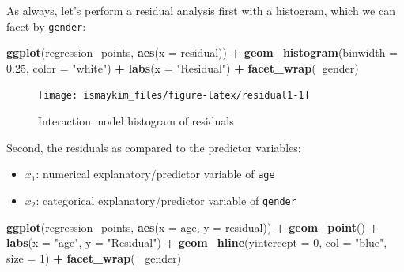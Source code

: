 \documentclass[12pt,]{krantz}
\makeatletter
\newenvironment{Shaded}{\begin{snugshade}}{\end{snugshade}}
\newcommand{\KeywordTok}[1]{\textcolor[rgb]{0.27,0.27,0.27}{\textbf{#1}}}
\newcommand{\DataTypeTok}[1]{\textcolor[rgb]{0.27,0.27,0.27}{#1}}
\newcommand{\DecValTok}[1]{\textcolor[rgb]{0.06,0.06,0.06}{#1}}
\newcommand{\FloatTok}[1]{\textcolor[rgb]{0.06,0.06,0.06}{#1}}
\newcommand{\StringTok}[1]{\textcolor[rgb]{0.5,0.5,0.5}{#1}}
\newcommand{\OperatorTok}[1]{\textcolor[rgb]{0.43,0.43,0.43}{\textbf{#1}}}
\newcommand{\NormalTok}[1]{#1}
\providecommand{\tightlist}{%
  \setlength{\itemsep}{0pt}\setlength{\parskip}{0pt}}
\newenvironment{kframe}{%
\medskip{}
\setlength{\fboxsep}{.8em}
 \def\at@end@of@kframe{}%
 \ifinner\ifhmode%
  \def\at@end@of@kframe{\end{minipage}}%
  \begin{minipage}{\columnwidth}%
 \fi\fi%
 \def\FrameCommand##1{\hskip\@totalleftmargin \hskip-\fboxsep
 \colorbox{shadecolor}{##1}\hskip-\fboxsep
     \hskip-\linewidth \hskip-\@totalleftmargin \hskip\columnwidth}%
 \MakeFramed {\advance\hsize-\width
   \@totalleftmargin\z@ \linewidth\hsize
   \@setminipage}}%
 {\par\unskip\endMakeFramed%
 \at@end@of@kframe}
\renewenvironment{Shaded}{\begin{kframe}}{\end{kframe}}
\makeatother
\begin{document}
As always, let's perform a residual analysis first with a histogram,
which we can facet by \texttt{gender}:

\begin{Shaded}
\begin{Highlighting}[]
\KeywordTok{ggplot}\NormalTok{(regression_points, }\KeywordTok{aes}\NormalTok{(}\DataTypeTok{x =}\NormalTok{ residual)) }\OperatorTok{+}
\StringTok{  }\KeywordTok{geom_histogram}\NormalTok{(}\DataTypeTok{binwidth =} \FloatTok{0.25}\NormalTok{, }\DataTypeTok{color =} \StringTok{"white"}\NormalTok{) }\OperatorTok{+}
\StringTok{  }\KeywordTok{labs}\NormalTok{(}\DataTypeTok{x =} \StringTok{"Residual"}\NormalTok{) }\OperatorTok{+}
\StringTok{  }\KeywordTok{facet_wrap}\NormalTok{(}\OperatorTok{~}\NormalTok{gender)}
\end{Highlighting}
\end{Shaded}

\begin{figure}

{\centering \texttt{[image: ismaykim\_files/figure-latex/residual1-1]} 

}

\caption{Interaction model histogram of residuals}\label{fig:residual1}
\end{figure}

Second, the residuals as compared to the predictor variables:

\begin{itemize}
\tightlist
\item
  \(x_1\): numerical explanatory/predictor variable of \texttt{age}
\item
  \(x_2\): categorical explanatory/predictor variable of \texttt{gender}
\end{itemize}

\begin{Shaded}
\begin{Highlighting}[]
\KeywordTok{ggplot}\NormalTok{(regression_points, }\KeywordTok{aes}\NormalTok{(}\DataTypeTok{x =}\NormalTok{ age, }\DataTypeTok{y =}\NormalTok{ residual)) }\OperatorTok{+}
\StringTok{  }\KeywordTok{geom_point}\NormalTok{() }\OperatorTok{+}
\StringTok{  }\KeywordTok{labs}\NormalTok{(}\DataTypeTok{x =} \StringTok{"age"}\NormalTok{, }\DataTypeTok{y =} \StringTok{"Residual"}\NormalTok{) }\OperatorTok{+}
\StringTok{  }\KeywordTok{geom_hline}\NormalTok{(}\DataTypeTok{yintercept =} \DecValTok{0}\NormalTok{, }\DataTypeTok{col =} \StringTok{"blue"}\NormalTok{, }\DataTypeTok{size =} \DecValTok{1}\NormalTok{) }\OperatorTok{+}
\StringTok{  }\KeywordTok{facet_wrap}\NormalTok{(}\OperatorTok{~}\StringTok{ }\NormalTok{gender)}
\end{Highlighting}
\end{Shaded}
\end{document}
